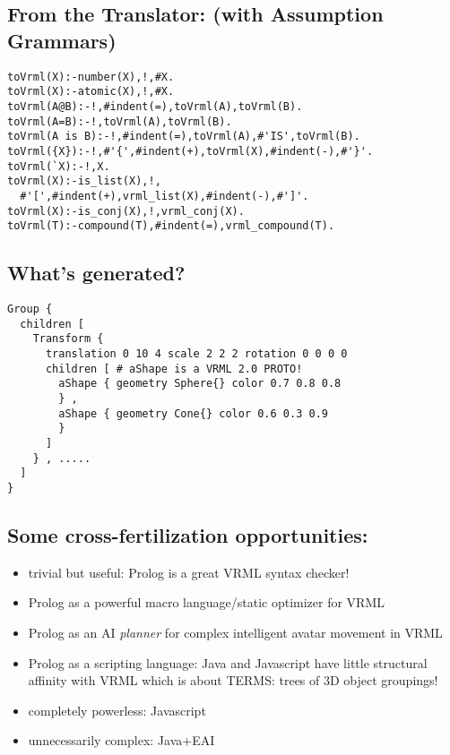 \documentclass{article}
\begin{document}
\subsection{From the Translator: (with Assumption Grammars)}
\begin{verbatim}
toVrml(X):-number(X),!,#X.
toVrml(X):-atomic(X),!,#X.
toVrml(A@B):-!,#indent(=),toVrml(A),toVrml(B).
toVrml(A=B):-!,toVrml(A),toVrml(B).
toVrml(A is B):-!,#indent(=),toVrml(A),#'IS',toVrml(B).
toVrml({X}):-!,#'{',#indent(+),toVrml(X),#indent(-),#'}'.
toVrml(`X):-!,X.
toVrml(X):-is_list(X),!,
  #'[',#indent(+),vrml_list(X),#indent(-),#']'.
toVrml(X):-is_conj(X),!,vrml_conj(X).
toVrml(T):-compound(T),#indent(=),vrml_compound(T).
\end{verbatim}

\subsection{What's generated?}
\begin{verbatim}
Group { 
  children [ 
    Transform { 
      translation 0 10 4 scale 2 2 2 rotation 0 0 0 0 
      children [ # aShape is a VRML 2.0 PROTO!
        aShape { geometry Sphere{} color 0.7 0.8 0.8 
        } , 
        aShape { geometry Cone{} color 0.6 0.3 0.9
        } 
      ] 
    } , .....
  ] 
} 
\end{verbatim}


\subsection{Some cross-fertilization opportunities:}
\begin{itemize}
\item trivial but useful: Prolog is a great VRML syntax checker!

\item Prolog as a powerful macro language/static optimizer for VRML

\item Prolog as an AI {\em planner} for complex intelligent
  avatar movement in VRML

\item Prolog as a scripting language: Java and Javascript have little
  structural affinity with VRML which is about TERMS: trees of
  3D object groupings!

\item completely powerless: Javascript
\item unnecessarily complex: Java+EAI
\end{itemize}
\end{document}
